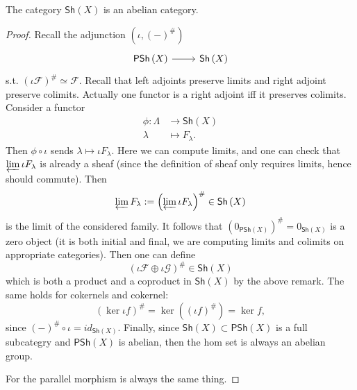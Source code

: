 \documentclass[../Main]{subfiles}
\begin{document}
\begin{cor}
	The category $\mathsf{Sh}\left(X\right)$ is an abelian category.
\end{cor} 
\begin{proof}
	Recall the adjunction $\left(\iota, (-)^\#\right)$
	\begin{equation}
	\begin{tikzcd}
		\mathsf{PSh}\left( X \right) \arrow[r, "", rightarrow] &
		\mathsf{Sh}\left(X\right)
	\end{tikzcd}
	\end{equation} 
	s.t. $\left( \iota\mathcal{F} \right)^\# \simeq \mathcal{F}$.
	Recall that left adjoints preserve limits and right adjoint preserve colimits.
	Actually one functor is a right adjoint iff it preserves colimits.
	Consider a functor
	\begin{align}
		\phi\colon \Lambda &\longrightarrow \mathsf{Sh}\left(X\right) \\
		\lambda &\longmapsto F_\lambda \nonumber
	.\end{align} 
	Then $\phi \circ \iota$ sends $\lambda \mapsto \iota F_\lambda$.
	Here we can compute limits, and one can check that
	$\varprojlim \iota F_\lambda$ is already a sheaf (since the definition of
	sheaf only requires limits, hence should commute).
	Then 
	\begin{equation}
	\varprojlim F_\lambda :=  
	\left( \varprojlim \iota F_\lambda \right)^\#	
	\in \mathsf{Sh}\left(X\right) 
	\end{equation} 
	is the limit of
	the considered family.
	It follows that $\left( 0_{\mathsf{PSh}\left( X \right)} \right)^\# = 0_{\mathsf{Sh}\left(X\right)}$
	is a zero object (it is both initial and final, we are computing limits and colimits
	on appropriate categories).
	Then one can define 
	\begin{equation}
		\left( \iota \mathcal{F} \oplus \iota \mathcal{G} \right)^\# \in \mathsf{Sh}\left(X\right)
	\end{equation} 
	which is both a product and a coproduct in $\mathsf{Sh}\left(X\right)$ by the above remark.
	The same holds for cokernels and cokernel:
	\begin{equation}
		\left( \ker \iota f \right)^\# = \ker \left( \left( \iota f \right)^\# \right) = \ker f
	,\end{equation} 
	since $\left( - \right)^\# \circ \iota = id_{\mathsf{Sh}\left(X\right)}$.
	Finally, since $\mathsf{Sh}\left(X\right) \subset \mathsf{PSh}\left( X \right)$
	is a full subcategry and $\mathsf{PSh}\left( X \right)$ is abelian, then the hom
	set is always an abelian group.

	For the parallel morphism is always the same thing.
\end{proof}
\end{document}
